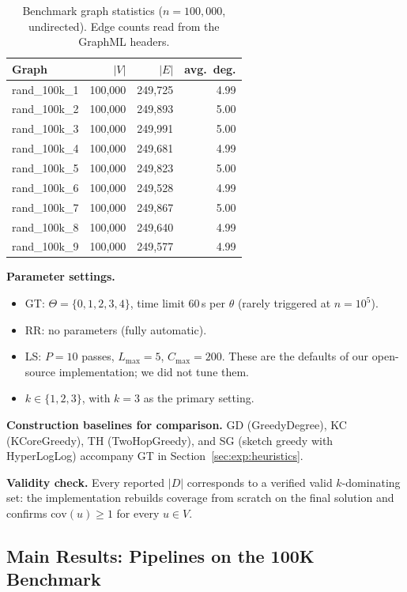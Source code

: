 \documentclass[11pt,a4paper]{article}
\newcommand{\cov}{\mathrm{cov}}
\begin{document}
\begin{table}[ht]
\centering
\caption{Benchmark graph statistics ($n=100{,}000$, undirected).
  Edge counts read from the GraphML headers.}
\label{tab:graph-stats}
\begin{tabular}{lrrr}
\toprule
\textbf{Graph} & $|V|$ & $|E|$ & \textbf{avg.\ deg.} \\
\midrule
rand\_100k\_1 & 100{,}000 & 249{,}725 & 4.99 \\
rand\_100k\_2 & 100{,}000 & 249{,}893 & 5.00 \\
rand\_100k\_3 & 100{,}000 & 249{,}991 & 5.00 \\
rand\_100k\_4 & 100{,}000 & 249{,}681 & 4.99 \\
rand\_100k\_5 & 100{,}000 & 249{,}823 & 5.00 \\
rand\_100k\_6 & 100{,}000 & 249{,}528 & 4.99 \\
rand\_100k\_7 & 100{,}000 & 249{,}867 & 5.00 \\
rand\_100k\_8 & 100{,}000 & 249{,}640 & 4.99 \\
rand\_100k\_9 & 100{,}000 & 249{,}577 & 4.99 \\
\bottomrule
\end{tabular}
\end{table}

\textbf{Parameter settings.}
\begin{itemize}[nosep]
  \item GT: $\Theta=\{0,1,2,3,4\}$, time limit 60\,s per $\theta$ (rarely
    triggered at $n=10^5$).
  \item RR: no parameters (fully automatic).
  \item LS: $P=10$ passes, $L_{\max}=5$, $C_{\max}=200$. These are the
    defaults of our open-source implementation; we did not tune them.
  \item $k\in\{1,2,3\}$, with $k=3$ as the primary setting.
\end{itemize}

\textbf{Construction baselines for comparison.}
GD (GreedyDegree), KC (KCoreGreedy), TH (TwoHopGreedy), and SG (sketch
greedy with HyperLogLog) accompany GT in
Section~\ref{sec:exp:heuristics}.

\textbf{Validity check.} Every reported $|D|$ corresponds to a verified
valid $k$-dominating set: the implementation rebuilds coverage from
scratch on the final solution and confirms $\cov(u)\ge 1$ for every
$u\in V$.


\subsection{Main Results: Pipelines on the 100K Benchmark}
\label{sec:exp:main}
\end{document}
